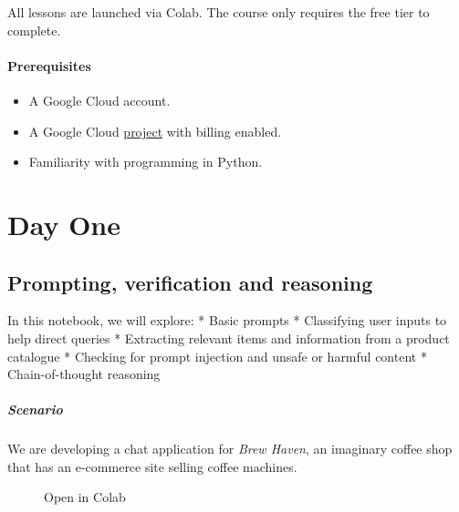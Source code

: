 \documentclass[
  letterpaper,
  DIV=11,
  numbers=noendperiod]{scrreprt}
\providecommand{\tightlist}{%
  \setlength{\itemsep}{0pt}\setlength{\parskip}{0pt}}\usepackage{longtable,booktabs,array}
\begin{document}
All lessons are launched via Colab. The course only requires the free
tier to complete.

\hypertarget{prerequisites}{%
\subsection*{Prerequisites}\label{prerequisites}}

\begin{itemize}
\tightlist
\item
  A Google Cloud account.
\item
  A Google Cloud
  \href{https://cloud.google.com/resource-manager/docs/creating-managing-projects}{project}
  with billing enabled.
\item
  Familiarity with programming in Python.
\end{itemize}

\part{Day One}

\hypertarget{prompting-verification-and-reasoning}{%
\chapter{Prompting, verification and
reasoning}\label{prompting-verification-and-reasoning}}

In this notebook, we will explore: * Basic prompts * Classifying user
inputs to help direct queries * Extracting relevant items and
information from a product catalogue * Checking for prompt injection and
unsafe or harmful content * Chain-of-thought reasoning

\hypertarget{scenario}{%
\subsubsection{Scenario}\label{scenario}}

We are developing a chat application for \emph{Brew Haven}, an imaginary
coffee shop that has an e-commerce site selling coffee machines.

\begin{figure}

{\centering 

\href{https://colab.research.google.com/github/rastringer/building_apps_with_genai_studio/blob/main/1_prompting_and_verification.ipynb}{}

}

\caption{Open in Colab}

\end{figure}
\end{document}

